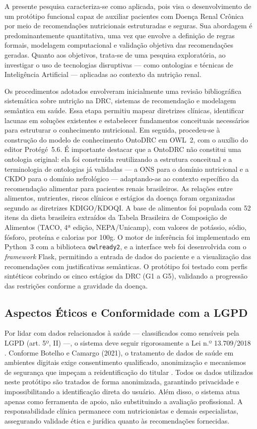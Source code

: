 \documentclass[12pt, a4paper, twocolumn]{article}
\begin{document}
A presente pesquisa caracteriza-se como aplicada, pois visa o desenvolvimento de um protótipo funcional capaz de auxiliar pacientes com Doença Renal Crônica por meio de recomendações nutricionais estruturadas e seguras. Sua abordagem é predominantemente quantitativa, uma vez que envolve a definição de regras formais, modelagem computacional e validação objetiva das recomendações geradas. Quanto aos objetivos, trata-se de uma pesquisa exploratória, ao investigar o uso de tecnologias disruptivas --- como ontologias e técnicas de Inteligência Artificial --- aplicadas ao contexto da nutrição renal.

Os procedimentos adotados envolveram inicialmente uma revisão bibliográfica sistemática sobre nutrição na DRC, sistemas de recomendação e modelagem semântica em saúde. Essa etapa permitiu mapear diretrizes clínicas, identificar lacunas em soluções existentes e estabelecer fundamentos conceituais necessários para estruturar o conhecimento nutricional. Em seguida, procedeu-se à construção do modelo de conhecimento OntoDRC em OWL~2, com o auxílio do editor Protégé~5.6. É importante destacar que a OntoDRC não constitui uma ontologia original: ela foi construída reutilizando a estrutura conceitual e a terminologia de ontologias já validadas --- a ONS para o domínio nutricional e a CKDO para o domínio nefrológico --- adaptando-as ao contexto específico da recomendação alimentar para pacientes renais brasileiros. As relações entre alimentos, nutrientes, riscos clínicos e estágios da doença foram organizadas segundo as diretrizes KDIGO/KDOQI. A base de alimentos foi populada com 52 itens da dieta brasileira extraídos da Tabela Brasileira de Composição de Alimentos (TACO, 4ª edição, NEPA/Unicamp), com valores de potássio, sódio, fósforo, proteína e calorias por 100g. O motor de inferência foi implementado em Python~3 com a biblioteca \texttt{owlready2}, e a interface web foi desenvolvida com o \textit{framework} Flask, permitindo a entrada de dados do paciente e a visualização das recomendações com justificativas semânticas. O protótipo foi testado com perfis sintéticos cobrindo os cinco estágios da DRC (G1 a G5), validando a progressão das restrições conforme a gravidade da doença.

    \subsection{Aspectos Éticos e Conformidade com a LGPD}

Por lidar com dados relacionados à saúde --- classificados como sensíveis pela LGPD (art. 5º, II) ---, o sistema deve seguir rigorosamente a Lei n.º 13.709/2018 \cite{brasil2018}. Conforme Botelho e Camargo (2021), o tratamento de dados de saúde em ambientes digitais exige consentimento qualificado, anonimização e mecanismos de segurança que impeçam a reidentificação do titular \cite{botelho2021}. Todos os dados utilizados neste protótipo são tratados de forma anonimizada, garantindo privacidade e impossibilitando a identificação direta do usuário. Além disso, o sistema atua apenas como ferramenta de apoio, não substituindo a avaliação profissional. A responsabilidade clínica permanece com nutricionistas e demais especialistas, assegurando validade ética e jurídica quanto às recomendações fornecidas.
\end{document}

